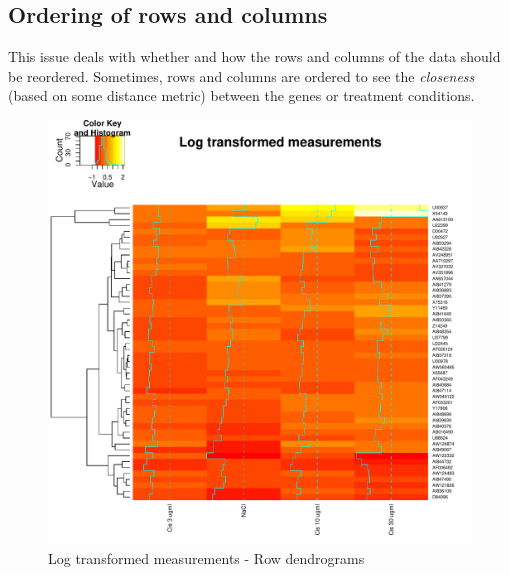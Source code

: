 \documentclass[12pt, oneside, letterpaper]{article}
\begin{document}
\subsection*{Ordering of rows and columns}
	This issue deals with whether and how the rows and columns
of the data should be reordered. Sometimes, rows and columns are
ordered to see the \textit{closeness} (based on some distance
metric) between the genes or treatment conditions.

\begin{figure}[p]

\begin{minipage}[t]{2.5in}
\begin{center}
\includegraphics[width=\textwidth]{logDataRowDendrogram}
\caption{Log transformed measurements - Row dendrograms}
\label{Log transformed measurements - Row dendrograms}
\end{center}
\end{minipage}
\hfill
\begin{minipage}[t]{2.5in}
\begin{center}

\end{center}
\end{minipage}
\end{figure}
\end{document}
